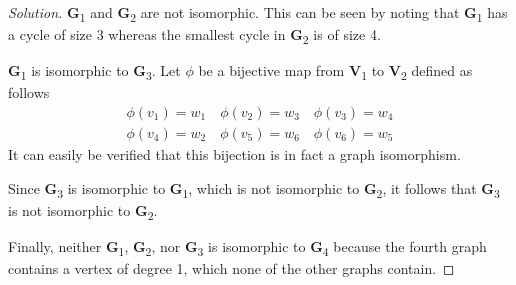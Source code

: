\documentclass[12pt]{article}
\theoremstyle{definition}
\newenvironment{solution}{
  \begin{proof}[Solution]
    \vspace{-8px}
    \setlength{\parskip}{4px}
    \setlength{\parindent}{0px}
}{
\end{proof}
}
\begin{document}
  \begin{solution}
    \textbf{G}\textsubscript{1} and \textbf{G}\textsubscript{2} are not isomorphic. This can be seen by noting that \textbf{G}\textsubscript{1} has a cycle of size 3 whereas the smallest cycle in \textbf{G}\textsubscript{2} is of size 4.

    \textbf{G}\textsubscript{1} is isomorphic to \textbf{G}\textsubscript{3}. Let \(\phi\) be a bijective map from \textbf{V}\textsubscript{1} to \textbf{V}\textsubscript{2} defined as follows
    \begin{align*}
      \phi(v_1) = w_1
      \quad
      \phi(v_2) = w_3
      \quad
      \phi(v_3) = w_4 \\
      \phi(v_4) = w_2
      \quad
      \phi(v_5) = w_6
      \quad
      \phi(v_6) = w_5
    \end{align*}
    It can easily be verified that this bijection is in fact a graph isomorphism.

    Since \textbf{G}\textsubscript{3} is isomorphic to \textbf{G}\textsubscript{1}, which is not isomorphic to \textbf{G}\textsubscript{2}, it follows that \textbf{G}\textsubscript{3} is not isomorphic to \textbf{G}\textsubscript{2}.

    Finally, neither \textbf{G}\textsubscript{1}, \textbf{G}\textsubscript{2}, nor \textbf{G}\textsubscript{3} is isomorphic to \textbf{G}\textsubscript{4} because the fourth graph contains a vertex of degree 1, which none of the other graphs contain.
  \end{solution}
\end{document}
